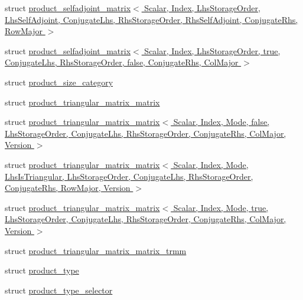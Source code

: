 \begin{DoxyCompactItemize}
\item 
struct \hyperlink{struct_eigen_1_1internal_1_1product__selfadjoint__matrix_3_01_scalar_00_01_index_00_01_lhs_stora8fa4562df6c92574330a318a01a976cf}{product\+\_\+selfadjoint\+\_\+matrix$<$ Scalar, Index, Lhs\+Storage\+Order, Lhs\+Self\+Adjoint, Conjugate\+Lhs, Rhs\+Storage\+Order, Rhs\+Self\+Adjoint, Conjugate\+Rhs, Row\+Major $>$}
\item 
struct \hyperlink{struct_eigen_1_1internal_1_1product__selfadjoint__matrix_3_01_scalar_00_01_index_00_01_lhs_storaad3bcb15c8c51e53cb4ff654ee80e230}{product\+\_\+selfadjoint\+\_\+matrix$<$ Scalar, Index, Lhs\+Storage\+Order, true, Conjugate\+Lhs, Rhs\+Storage\+Order, false, Conjugate\+Rhs, Col\+Major $>$}
\item 
struct \hyperlink{struct_eigen_1_1internal_1_1product__size__category}{product\+\_\+size\+\_\+category}
\item 
struct \hyperlink{struct_eigen_1_1internal_1_1product__triangular__matrix__matrix}{product\+\_\+triangular\+\_\+matrix\+\_\+matrix}
\item 
struct \hyperlink{struct_eigen_1_1internal_1_1product__triangular__matrix__matrix_3_01_scalar_00_01_index_00_01_mo073ec17ef20b8a50e2a38e240dd8d795}{product\+\_\+triangular\+\_\+matrix\+\_\+matrix$<$ Scalar, Index, Mode, false, Lhs\+Storage\+Order, Conjugate\+Lhs, Rhs\+Storage\+Order, Conjugate\+Rhs, Col\+Major, Version $>$}
\item 
struct \hyperlink{struct_eigen_1_1internal_1_1product__triangular__matrix__matrix_3_01_scalar_00_01_index_00_01_moa7595ecc6fa7617b9a7dfbf733dbf94b}{product\+\_\+triangular\+\_\+matrix\+\_\+matrix$<$ Scalar, Index, Mode, Lhs\+Is\+Triangular, Lhs\+Storage\+Order, Conjugate\+Lhs, Rhs\+Storage\+Order, Conjugate\+Rhs, Row\+Major, Version $>$}
\item 
struct \hyperlink{struct_eigen_1_1internal_1_1product__triangular__matrix__matrix_3_01_scalar_00_01_index_00_01_mocecf6b0a946de08ae1ae622ae91f7d88}{product\+\_\+triangular\+\_\+matrix\+\_\+matrix$<$ Scalar, Index, Mode, true, Lhs\+Storage\+Order, Conjugate\+Lhs, Rhs\+Storage\+Order, Conjugate\+Rhs, Col\+Major, Version $>$}
\item 
struct \hyperlink{struct_eigen_1_1internal_1_1product__triangular__matrix__matrix__trmm}{product\+\_\+triangular\+\_\+matrix\+\_\+matrix\+\_\+trmm}
\item 
struct \hyperlink{struct_eigen_1_1internal_1_1product__type}{product\+\_\+type}
\item 
struct \hyperlink{struct_eigen_1_1internal_1_1product__type__selector}{product\+\_\+type\+\_\+selector}

\end{DoxyCompactItemize}
